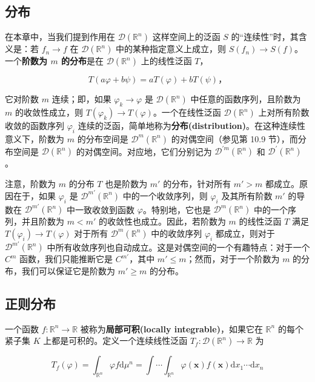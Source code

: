 \subsection{分布}

在本章中，当我们提到作用在 $\mathcal{D}(\mathbb{R}^n)$
这样空间上的泛函 $S$ 的``连续性''时，其含义是：若 $f_n \to f$ 在
$\mathcal{D}(\mathbb{R}^n)$ 中的某种指定意义上成立，则
$S(f_n) \to S(f)$。一个\textbf{阶数为 $m$ 的分布}是在
$\mathcal{D}(\mathbb{R}^n)$ 上的线性泛函 $T$，

$$
T(a\varphi + b\psi) = aT(\varphi) + bT(\psi)，
$$

它对阶数 $m$ 连续；即，如果 $\varphi_k \to \varphi$ 是
$\mathcal{D}(\mathbb{R}^n)$ 中任意的函数序列，且阶数为 $m$
的收敛性成立，则 $T(\varphi_k) \to T(\varphi)$。一个在线性泛函
$\mathcal{D}(\mathbb{R}^n)$ 上对所有阶数收敛的函数序列 $\varphi_i$
连续的泛函，简单地称为\textbf{分布(distribution)}。在这种连续性意义下，阶数为
$m$ 的分布空间是 $\mathcal{D}^m(\mathbb{R}^n)$ 的对偶空间（参见第
10.9 节），而分布空间是 $\mathcal{D}(\mathbb{R}^n)$
的对偶空间。对应地，它们分别记为
$\mathcal{D}^{\prime m}(\mathbb{R}^n)$ 和
$\mathcal{D}^{\prime}(\mathbb{R}^n)$。

注意，阶数为 $m$ 的分布 $T$ 也是阶数为 $m'$ 的分布，针对所有
$m' > m$ 都成立。原因在于，如果 $\varphi_i$ 是
$\mathcal{D}^{m'}(\mathbb{R}^n)$ 中的一个收敛序列，则 $\varphi_i$
及其所有阶数 $m'$ 的导数在 $\mathcal{D}^{m'}(\mathbb{R}^n)$
中一致收敛到函数 $\varphi$。特别地，它也是
$\mathcal{D}^m(\mathbb{R}^n)$ 中的一个序列，并且阶数为 $m < m'$
的收敛性也成立。因此，若阶数为 $m$ 的线性泛函 $T$ 满足
$T(\varphi_i) \to T(\varphi)$ 对于所有 $\mathcal{D}^m(\mathbb{R}^n)$
中的收敛序列 $\varphi_i$ 都成立，则对于
$\mathcal{D}^{m'}(\mathbb{R}^n)$
中所有收敛序列也自动成立。这是对偶空间的一个有趣特点：对于一个 $C^m$
函数，我们只能推断它是 $C^{m'}$，其中
$m' \leq m$；然而，对于一个阶数为 $m$ 的分布，我们可以保证它是阶数为
$m' \geq m$ 的分布。

\subsection{正则分布}

一个函数 $f: \mathbb{R}^n \to \mathbb{R}$
被称为\textbf{局部可积(locally integrable)}，如果它在 $\mathbb{R}^n$
的每个紧子集 $K$ 上都是可积的。定义一个连续线性泛函
$T_f: \mathcal{D}(\mathbb{R}^n) \to \mathbb{R}$ 为

$$
T_f(\varphi) = \int_{\mathbb{R}^n} \varphi f \mathrm{d}\mu^n = \int \cdots \int_{\mathbb{R}^n} \varphi(\mathbf{x}) f(\mathbf{x}) \mathrm{d}x_1 \cdots \mathrm{d}x_n
$$

